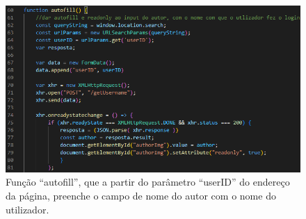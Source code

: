 \documentclass{report}
\begin{document}
\begin{figure}[!hbtp]

        \includegraphics[scale=0.66]{Images_code/9 - js autofill.png}
        \caption{\label{Estrutura}Função “autofill”, que a partir do parâmetro “userID” do endereço da página, preenche o campo de nome do autor com o nome do utilizador.}
\end{figure}
\end{document}
